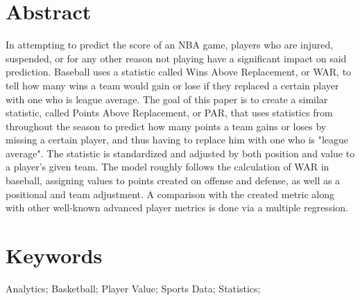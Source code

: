 \documentclass[12pt]{article}
\begin{document}
\section*{Abstract}
In attempting to predict the score of an NBA game, players who are 
injured, suspended, or for any other 
reason not playing have a significant impact on said prediction. Baseball 
uses a statistic called Wins Above 
Replacement, or WAR, to tell how many wins a team would gain or lose if 
they replaced a certain player 
with one who is league average. The goal of this paper is to create a 
similar statistic, called Points Above 
Replacement, or PAR, that uses statistics from throughout the season to 
predict how many points a team 
gains or loses by missing a certain player, and thus having to replace him 
with one who is "league 
average". The statistic is standardized and adjusted by both position and 
value to a player's given team. 
The model roughly follows the calculation of WAR in baseball, assigning 
values to points created on offense 
and defense, as well as a positional and team adjustment. A comparison 
with the created metric along with 
other well-known advanced player metrics is done via a multiple 
regression.

\section*{Keywords} 
Analytics; Basketball; Player Value; Sports Data; Statistics; 
\vspace{.12 in}
\end{document}
